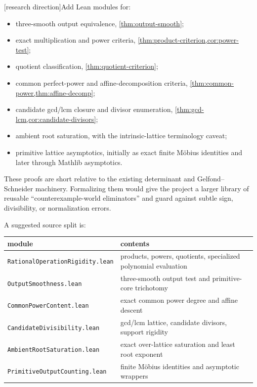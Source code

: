 \documentclass[11pt,oneside]{article}
\theoremstyle{definition}
\newcommand{\tagProposal}{\textcolor{BrickRed}{\textsf{[research direction]}}}
\begin{document}
\tagProposal Add Lean modules for:
\begin{itemize}
\item three-smooth output equivalence, \cref{thm:output-smooth};
\item exact multiplication and power criteria,
\cref{thm:product-criterion,cor:power-test};
\item quotient classification, \cref{thm:quotient-criterion};
\item common perfect-power and affine-decomposition criteria,
\cref{thm:common-power,thm:affine-decomp};
\item candidate gcd/lcm closure and divisor enumeration,
\cref{thm:gcd-lcm,cor:candidate-divisors};
\item ambient root saturation, with the intrinsic-lattice terminology caveat;
\item primitive lattice asymptotics, initially as exact finite M\"obius identities and later
through Mathlib asymptotics.
\end{itemize}

These proofs are short relative to the existing determinant and Gelfond--Schneider
machinery.  Formalizing them would give the project a larger library of reusable
``counterexample-world eliminators'' and guard against subtle sign, divisibility, or
normalization errors.

A suggested source split is:
\begin{center}
\begin{tabularx}{0.95\textwidth}{@{}lY@{}}
\toprule
module & contents\\
\midrule
\texttt{RationalOperationRigidity.lean} & products, powers, quotients, specialized polynomial evaluation\\
\texttt{OutputSmoothness.lean} & three-smooth output test and primitive-core trichotomy\\
\texttt{CommonPowerContent.lean} & exact common power degree and affine descent\\
\texttt{CandidateDivisibility.lean} & gcd/lcm lattice, candidate divisors, support rigidity\\
\texttt{AmbientRootSaturation.lean} & exact over-lattice saturation and least root exponent\\
\texttt{PrimitiveOutputCounting.lean} & finite M\"obius identities and asymptotic wrappers\\
\bottomrule
\end{tabularx}
\end{center}
\end{document}
